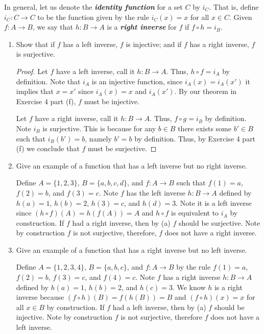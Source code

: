 \documentclass[12pt]{article}
\begin{document}
 In general, let us denote the \textbf{\textit{identity function}} for a 
set $C$ by $i_C$. That is, define $i_C: C \to C$ to be the function given by the rule 
$i_C(x) = x$ for all $x \in C$. Given $f: A \to B$, we say that $h: B \to A$ is a 
\textbf{\textit{right inverse}} for $f$ if $f \circ h = i_B$.
\begin{enumerate}[label=(\alph*)]
	\item Show that if $f$ has a left inverse, $f$ is injective; and if $f$ has a right
	inverse, $f$ is surjective.
	\begin{proof}
		Let $f$ have a left inverse, call it $h: B \to A$. Thus, $h \circ f = i_A$ by 
		definition. Note that $i_A$ is an injective function, since $i_A(x) = i_A(x')$
		it implies that $x = x'$ since $i_A(x) = x$ and $i_A(x')$. By our theorem in
		Exercise 4 part (f), $f$ must be injective.
		
		Let $f$ have a right inverse, call it $h: B \to A$. Thus, $f \circ g = i_B$ by definition.
		Note $i_B$ is surjective. This is because for any $b \in B$ there exists some $b' \in B$
		such that $i_B(b') = b$, namely $b' = b$ by definition. Thus, by Exercise 4 part (f)
		we conclude that $f$ must be surjective.
	\end{proof}
	\item Give an example of a function that has a left inverse but no right inverse.
	
	Define $A = \{1, 2, 3\}$, $B = \{a, b, c, d\}$, and $f: A \to B$ such that 
	$f(1) = a$, $f(2) = b$, and $f(3) = c$. Note $f$ has the left inverse
	$h: B \to A$ defined by $h(a) = 1$, $h(b) = 2$, $h(3) = c$, and $h(d) = 3$.
	Note it is a left inverse since $(h \circ f)(A) = h(f(A)) = A$ and 
	$h \circ f$ is equivalent to $i_A$ by construction. If $f$ had a right inverse,
	then by (a) $f$ should be surjective. Note by construction $f$ is not surjective,
	therefore, $f$ does not have a right inverse.
	 
	\item Give an example of a function that has a right inverse but no left inverse.
	
	Define $A = \{1, 2, 3, 4\}$, $B = \{a, b, c\}$, and $f: A \to B$ by the rule
	$f(1) = a$, $f(2) = b$, $f(3) = c$, and $f(4) = c$. Note $f$ has a right inverse
	$h: B \to A$ defined by $h(a) = 1$, $h(b) = 2$, and $h(c) = 3$. We know $h$ is a 
	right inverse because $(f \circ h)(B) = f(h(B)) = B$ and $(f \circ h)(x) = x$ for 
	all $x \in B$ by construction. If $f$ had a left inverse, then by (a) $f$ should
	be injective. Note by construction $f$ is not surjective, therefore $f$ does not 
	have a left inverse.
	

\end{enumerate}
\end{document}

